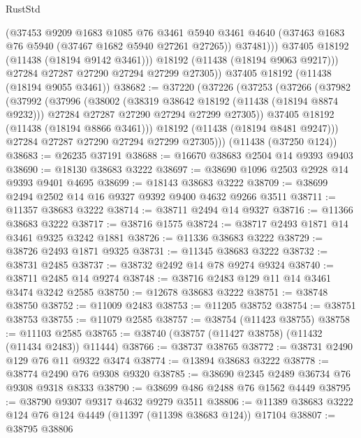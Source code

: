 \begin{lexlean}{RustStd}
\begin{coremodule}
                (@37453
                  @9209
                  @1683
                  @1085
                  @76
                  @3461
                  @5940
                  @3461
                  @4640
                  (@37463 @1683 @76 @5940 (@37467 @1682 @5940 @27261 @27265))
                  @37481)))
            @37405
            @18192
            (@11438 (@18194 @9142 @3461)))
          @18192
          (@11438 (@18194 @9063 @9217)))
        @27284
        @27287
        @27290
        @27294
        @27299
        @27305))
    @37405
    @18192
    (@11438 (@18194 @9055 @3461))
@38682 := @37220
    (@37226
      (@37253
        (@37266
          (@37982
            (@37992
              (@37996
                (@38002
                  (@38319 @38642 @18192 (@11438 (@18194 @8874 @9232)))
                  @27284
                  @27287
                  @27290
                  @27294
                  @27299
                  @27305))
              @37405
              @18192
              (@11438 (@18194 @8866 @3461)))
            @18192
            (@11438 (@18194 @8481 @9247)))
          @27284
          @27287
          @27290
          @27294
          @27299
          @27305)))
    (@11438 (@37250 @124))
@38683 := @26235 @37191
@38688 := @16670 @38683 @2504 @14 @9393 @9403
@38690 := @18130 @38683 @3222
@38697 := @38690 @1096 @2503 @2928 @14 @9393 @9401 @4695
@38699 := @18143 @38683 @3222
@38709 := @38699 @2494 @2502 @14 @16 @9327 @9392 @9400 @4632 @9266 @3511
@38711 := @11357 @38683 @3222
@38714 := @38711 @2494 @14 @9327
@38716 := @11366 @38683 @3222
@38717 := @38716 @1575
@38724 := @38717 @2493 @1871 @14 @3461 @9325 @3242 @1881
@38726 := @11336 @38683 @3222
@38729 := @38726 @2493 @1871 @9325
@38731 := @11345 @38683 @3222
@38732 := @38731 @2485
@38737 := @38732 @2492 @14 @78 @9274 @9324
@38740 := @38711 @2485 @14 @9274
@38748 := @38716 @2483 @129 @11 @14 @3461 @3474 @3242 @2585
@38750 := @12678 @38683 @3222
@38751 := @38748 @38750
@38752 := @11009 @2483
@38753 := @11205 @38752
@38754 := @38751 @38753
@38755 := @11079 @2585
@38757 := @38754 (@11423 @38755)
@38758 := @11103 @2585
@38765 := @38740 (@38757 (@11427 @38758) (@11432 (@11434 @2483)) @11444)
@38766 := @38737 @38765
@38772 := @38731 @2490 @129 @76 @11 @9322 @3474
@38774 := @13894 @38683 @3222
@38778 := @38774 @2490 @76 @9308 @9320
@38785 := @38690 @2345 @2489 @36734 @76 @9308 @9318 @8333
@38790 := @38699 @486 @2488 @76 @1562 @4449
@38795 := @38790 @9307 @9317 @4632 @9279 @3511
@38806 := @11389 @38683 @3222 @124 @76 @124 @4449 (@11397 (@11398 @38683 @124)) @17104
@38807 := @38795 @38806

\end{coremodule}
\end{lexlean}
